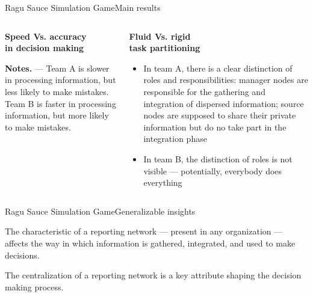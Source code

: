 \documentclass[notes, aspectratio=1610]{beamer}
\begin{document}
\begin{frame}{Ragu Sauce Simulation Game}{Main results}
	\begin{columns}[t]
		\begin{column}{0.5\textwidth}
			\begin{center}
				\textbf{Speed Vs. accuracy \\in decision making}

				

			\end{center}

			\scriptsize \textbf{Notes.} --- Team A is slower in 
			processing information, but less likely to make mistakes. 
			Team B is faster in processing information, but more 
			likely to make mistakes.
		\end{column}
		\begin{column}{0.5\textwidth}
			\begin{center}
				\textbf{Fluid Vs. rigid \\task partitioning}

				\begin{itemize}
					\item In team A, there is a clear 
					distinction of roles and responsibilities:
					manager nodes are responsible for the 
					gathering and integration of dispersed 
					information; source nodes are 
					supposed to share their private information 
					but do no take part in the integration phase
					\item In team B, the distinction of roles 
					is not visible --- potentially, everybody 
					does everything
				\end{itemize}
			\end{center}
		\end{column}
	\end{columns}
\end{frame}

\begin{frame}{Ragu Sauce Simulation Game}{Generalizable insights}
	\begin{tcolorbox}[
		colback=tri_1!5!white,
		colframe=tri_1!90!black,
		title={\centering \small Proposition 3}]
		The characteristic of a reporting network --- present in any 
		organization --- affects the way in which information is 
		gathered, integrated, and used to make decisions.
	\end{tcolorbox}

	\pause

	\begin{tcolorbox}[
		colback=tri_2!5!white,
		colframe=tri_2!90!black,
		title={\centering \small Corollario to Proposition 3}]
		The centralization of a reporting network is a key attribute 
		shaping the decision making process.
	\end{tcolorbox}
\end{frame}
\end{document}
